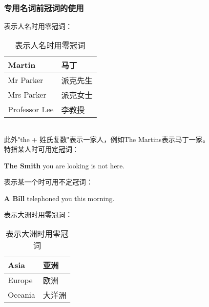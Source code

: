 \documentclass[UTF8]{ctexart}
\newcommand{\littf}[1]{{\hspace{3pt}\ttfamily #1}}
\begin{document}
\newpage

\subsubsection{专用名词前冠词的使用}
    表示人名时用零冠词：
    \begin{table}[h!]
        \begin{center}
            \ttfamily
            \begin{tabular}{p{180pt}|p{100pt}}
                \hline
                Martin&马丁\\ \hline
                Mr Parker&派克先生\\ \hline
                Mrs Parker&派克女士\\ \hline
                Professor Lee&李教授\\ \hline
            \end{tabular}
            \rmfamily
            \caption{表示人名时用零冠词}
        \end{center}
    \end{table}\\
    此外\littf{"the + 姓氏复数"}表示一家人，例如\littf{The Martins}表示马丁一家。\\[3mm]
    特指某人时可用定冠词：
    \begin{center}
        \large\ttfamily
        \textbf{The Smith} you are looking is not here.\\[4mm]
    \end{center}
    表示某一个时可用不定冠词：
    \begin{center}
        \large\ttfamily
        \textbf{A Bill} telephoned you this morning.\\[4mm]
    \end{center}
    表示大洲时用零冠词：
    \begin{table}[h!]
        \begin{center}
            \ttfamily
            \begin{tabular}{p{180pt}|p{100pt}}
                \hline
                Asia&亚洲\\ \hline
                Europe&欧洲\\ \hline
                Oceania&大洋洲\\ \hline
            \end{tabular}
            \rmfamily
            \caption{表示大洲时用零冠词}
        \end{center}
    \end{table}\\
\end{document}
